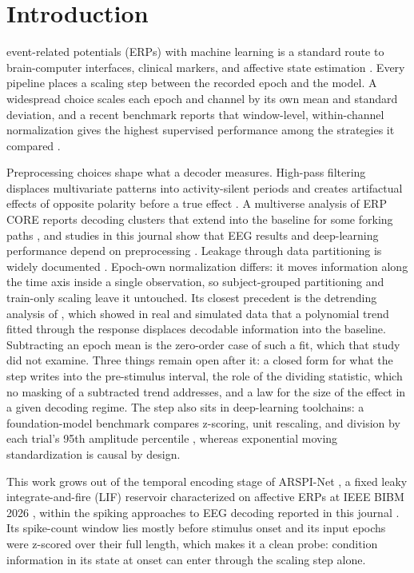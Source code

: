 \section{Introduction}
 event-related potentials (ERPs) with machine learning is a standard route to brain-computer interfaces, clinical markers, and affective state estimation \cite{blankertz2011erp,roy2019review,craik2019review,elouahidi2024simple}. Every pipeline places a scaling step between the recorded epoch and the model. A widespread choice scales each epoch and channel by its own mean and standard deviation, and a recent benchmark reports that window-level, within-channel normalization gives the highest supervised performance among the strategies it compared \cite{truong2025normalization}.

Preprocessing choices shape what a decoder measures. High-pass filtering displaces multivariate patterns into activity-silent periods \cite{vandriel2021highpass} and creates artifactual effects of opposite polarity before a true effect \cite{tanner2015highpass}. A multiverse analysis of ERP CORE reports decoding clusters that extend into the baseline for some forking paths \cite{kessler2025preprocessing}, and studies in this journal show that EEG results and deep-learning performance depend on preprocessing \cite{robbins2020sensitive,delpup2025more}. Leakage through data partitioning is widely documented \cite{brookshire2024leakage,kapoor2023leakage}. Epoch-own normalization differs: it moves information along the time axis inside a single observation, so subject-grouped partitioning and train-only scaling leave it untouched. Its closest precedent is the detrending analysis of \cite{vandriel2021highpass}, which showed in real and simulated data that a polynomial trend fitted through the response displaces decodable information into the baseline. Subtracting an epoch mean is the zero-order case of such a fit, which that study did not examine. Three things remain open after it: a closed form for what the step writes into the pre-stimulus interval, the role of the dividing statistic, which no masking of a subtracted trend addresses, and a law for the size of the effect in a given decoding regime. The step also sits in deep-learning toolchains: a foundation-model benchmark compares z-scoring, unit rescaling, and division by each trial's 95th amplitude percentile \cite{wu2025adabrain}, whereas exponential moving standardization \cite{schirrmeister2017deep} is causal by design.

This work grows out of the temporal encoding stage of ARSPI-Net \cite{lane2023arspinet,lane2024arspinet,lane2026dissertation}, a fixed leaky integrate-and-fire (LIF) reservoir \cite{maass2002lsm} characterized on affective ERPs at IEEE BIBM 2026 \cite{lane2026bibm}, within the spiking approaches to EEG decoding reported in this journal \cite{gong2023snn,sam2023depression}. Its spike-count window lies mostly before stimulus onset and its input epochs were z-scored over their full length, which makes it a clean probe: condition information in its state at onset can enter through the scaling step alone.

